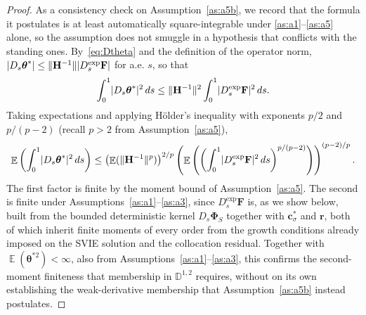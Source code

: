 \documentclass[11pt, a4paper]{article}
\theoremstyle{theoremstyle}
\theoremstyle{definitionstyle}
\newcommand{\dd}{\mathop{}\!d}
\DeclareMathOperator{\EE}{\mathbb E}
\DeclarePairedDelimiter{\norm}{\lVert}{\rVert}
\DeclarePairedDelimiter{\abs}{\lvert}{\rvert}
\begin{document}
\begin{proof}
    As a consistency check on Assumption~\ref{as:a5b}, we record that the formula it postulates is at least automatically square-integrable under \ref{as:a1}--\ref{as:a5} alone, so the assumption does not smuggle in a hypothesis that conflicts with the standing ones. By~\eqref{eq:Dtheta} and the definition of the operator norm, $\abs{D_s \boldsymbol\theta^*} \le \norm{\mathbf H^{-1}} \abs{D_s^{\exp}\mathbf F}$ for a.e. $s$, so that
    \begin{equation}
        \int_0^1 \abs{D_s \boldsymbol\theta^*}^2 \dd{s} \le \norm{\mathbf H^{-1}}^2 \int_0^1 \abs{D_s^{\exp}\mathbf F}^2 \dd{s}.
    \end{equation}
    Taking expectations and applying H\"older's inequality \cite{folland1999real} with exponents $p/2$ and $p/(p-2)$ (recall $p > 2$ from Assumption~\ref{as:a5}),
    \begin{equation}
        \EE \left ( \int_0^1 \abs{D_s \boldsymbol\theta^*}^2 \dd{s} \right ) \leq \left ( \EE (\norm{\mathbf H^{-1}}^p) \right )^{2/p} \left ( \EE \left ( \left ( \int_0^1 \abs{D_s^{\exp}\mathbf F}^2 \dd{s} \right )^{p/(p-2)} \right ) \right )^{(p-2)/p}.
    \end{equation}
    The first factor is finite by the moment bound of Assumption~\ref{as:a5}. The second is finite under Assumptions~\ref{as:a1}--\ref{as:a3}, since $D_s^{\exp}\mathbf F$ is, as we show below, built from the bounded deterministic kernel $D_s \boldsymbol\Phi_S$ together with $\mathbf c_\sigma^*$ and $\mathbf r$, both of which inherit finite moments of every order from the growth conditions already imposed on the SVIE solution and the collocation residual. Together with $\EE (\boldsymbol\theta^{*2}) < \infty$, also from Assumptions~\ref{as:a1}--\ref{as:a3}, this confirms the second-moment finiteness that membership in $\mathbb D^{1,2}$ requires, without on its own establishing the weak-derivative membership that Assumption~\ref{as:a5b} instead postulates.
 

\end{proof}
\end{document}
